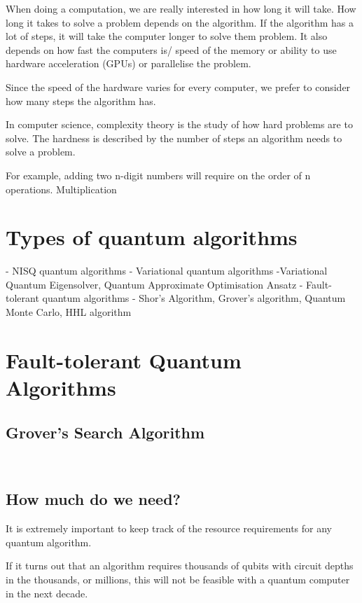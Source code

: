 \documentclass{book}
\begin{document}
When doing a computation, we are really interested in how long it will take. How long it takes to solve a problem depends on the algorithm. If the algorithm has a lot of steps, it will take the computer longer to solve them problem. It also depends on how fast the computers is/ speed of the memory or ability to use hardware acceleration (GPUs) or parallelise the problem. 

Since the speed of the hardware varies for every computer, we prefer to consider how many steps the algorithm has. 

In computer science, complexity theory is the study of how hard problems are to solve. The hardness is described by the number of steps an algorithm needs to solve a problem.

For example, adding two n-digit numbers will require on the order of n operations. Multiplication 



\section{ Types of quantum algorithms} 


- NISQ quantum algorithms 
- Variational quantum algorithms 
    -Variational Quantum Eigensolver, Quantum Approximate Optimisation Ansatz
- Fault-tolerant quantum algorithms 
    - Shor's Algorithm, Grover's algorithm, Quantum Monte Carlo,  HHL algorithm 


\section{Fault-tolerant Quantum Algorithms} 

\subsection{ Grover's Search Algorithm}


\



\subsection{How much do we need?}

It is extremely important to keep track of the resource requirements for any quantum algorithm. 

If it turns out that an algorithm requires thousands of qubits with circuit depths in the thousands, or millions, this will not be feasible with a quantum computer in the next decade. 
\end{document}
